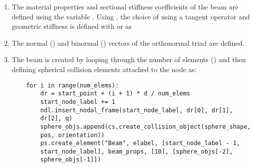 \begin{enumerate}
    \item The material properties and sectional stiffness coefficients of the beam are defined using the variable . Using , the choice of using a tangent operator and geometric stiffness is defined with  or  as 
    \item The normal () and binormal () vectors of the orthonormal triad are defined.
    \item The beam is created by looping through the number of elements () and then defining spherical collision elements attached to the node as:
    \pythonstyle
    \begin{tcolorbox}\begin{lstlisting}
    for i in range(num_elems):
        dr = start_point + (i + 1) * d / num_elems
        start_node_label += 1
        ndl.insert_nodal_frame(start_node_label, dr[0], dr[1], 
        dr[2], q)
        sphere_objs.append(cs.create_collision_object(sphere_shape, 
        pos, orientation))
        ps.create_element("Beam", elabel, [start_node_label - 1, 
        start_node_label], beam_props, [10], [sphere_objs[-2], 
        sphere_objs[-1]])
        

\end{lstlisting}
\end{tcolorbox}
\end{enumerate}
